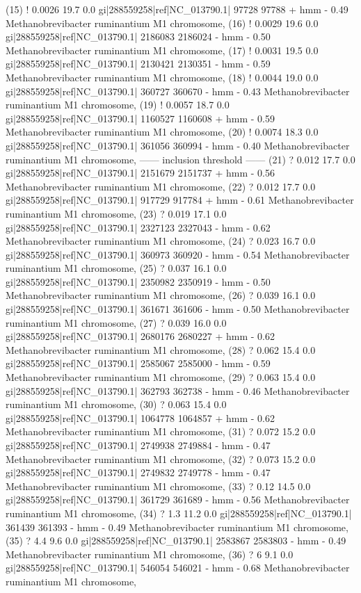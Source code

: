 \begin{sreoutput}
 (15) !    0.0026   19.7   0.0  gi|288559258|ref|NC_013790.1|   97728   97788 + hmm     - 0.49  Methanobrevibacter ruminantium M1 chromosome, 
 (16) !    0.0029   19.6   0.0  gi|288559258|ref|NC_013790.1| 2186083 2186024 - hmm     - 0.50  Methanobrevibacter ruminantium M1 chromosome, 
 (17) !    0.0031   19.5   0.0  gi|288559258|ref|NC_013790.1| 2130421 2130351 - hmm     - 0.59  Methanobrevibacter ruminantium M1 chromosome, 
 (18) !    0.0044   19.0   0.0  gi|288559258|ref|NC_013790.1|  360727  360670 - hmm     - 0.43  Methanobrevibacter ruminantium M1 chromosome, 
 (19) !    0.0057   18.7   0.0  gi|288559258|ref|NC_013790.1| 1160527 1160608 + hmm     - 0.59  Methanobrevibacter ruminantium M1 chromosome, 
 (20) !    0.0074   18.3   0.0  gi|288559258|ref|NC_013790.1|  361056  360994 - hmm     - 0.40  Methanobrevibacter ruminantium M1 chromosome, 
 ------ inclusion threshold ------
 (21) ?     0.012   17.7   0.0  gi|288559258|ref|NC_013790.1| 2151679 2151737 + hmm     - 0.56  Methanobrevibacter ruminantium M1 chromosome, 
 (22) ?     0.012   17.7   0.0  gi|288559258|ref|NC_013790.1|  917729  917784 + hmm     - 0.61  Methanobrevibacter ruminantium M1 chromosome, 
 (23) ?     0.019   17.1   0.0  gi|288559258|ref|NC_013790.1| 2327123 2327043 - hmm     - 0.62  Methanobrevibacter ruminantium M1 chromosome, 
 (24) ?     0.023   16.7   0.0  gi|288559258|ref|NC_013790.1|  360973  360920 - hmm     - 0.54  Methanobrevibacter ruminantium M1 chromosome, 
 (25) ?     0.037   16.1   0.0  gi|288559258|ref|NC_013790.1| 2350982 2350919 - hmm     - 0.50  Methanobrevibacter ruminantium M1 chromosome, 
 (26) ?     0.039   16.1   0.0  gi|288559258|ref|NC_013790.1|  361671  361606 - hmm     - 0.50  Methanobrevibacter ruminantium M1 chromosome, 
 (27) ?     0.039   16.0   0.0  gi|288559258|ref|NC_013790.1| 2680176 2680227 + hmm     - 0.62  Methanobrevibacter ruminantium M1 chromosome, 
 (28) ?     0.062   15.4   0.0  gi|288559258|ref|NC_013790.1| 2585067 2585000 - hmm     - 0.59  Methanobrevibacter ruminantium M1 chromosome, 
 (29) ?     0.063   15.4   0.0  gi|288559258|ref|NC_013790.1|  362793  362738 - hmm     - 0.46  Methanobrevibacter ruminantium M1 chromosome, 
 (30) ?     0.063   15.4   0.0  gi|288559258|ref|NC_013790.1| 1064778 1064857 + hmm     - 0.62  Methanobrevibacter ruminantium M1 chromosome, 
 (31) ?     0.072   15.2   0.0  gi|288559258|ref|NC_013790.1| 2749938 2749884 - hmm     - 0.47  Methanobrevibacter ruminantium M1 chromosome, 
 (32) ?     0.073   15.2   0.0  gi|288559258|ref|NC_013790.1| 2749832 2749778 - hmm     - 0.47  Methanobrevibacter ruminantium M1 chromosome, 
 (33) ?      0.12   14.5   0.0  gi|288559258|ref|NC_013790.1|  361729  361689 - hmm     - 0.56  Methanobrevibacter ruminantium M1 chromosome, 
 (34) ?       1.3   11.2   0.0  gi|288559258|ref|NC_013790.1|  361439  361393 - hmm     - 0.49  Methanobrevibacter ruminantium M1 chromosome, 
 (35) ?       4.4    9.6   0.0  gi|288559258|ref|NC_013790.1| 2583867 2583803 - hmm     - 0.49  Methanobrevibacter ruminantium M1 chromosome, 
 (36) ?         6    9.1   0.0  gi|288559258|ref|NC_013790.1|  546054  546021 - hmm     - 0.68  Methanobrevibacter ruminantium M1 chromosome, 
\end{sreoutput}

